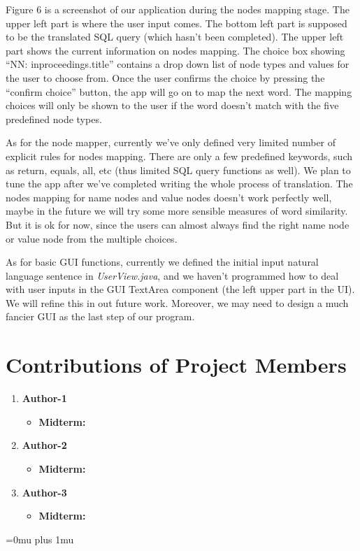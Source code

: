 \documentclass[twocolumn]{article}
\begin{document}
Figure 6 is a screenshot of our application during the nodes mapping stage. The upper left part is where the user input comes. The bottom left part is supposed to be the translated SQL query (which hasn’t been completed). The upper left part shows the current information on nodes mapping. The choice box showing “NN: inproceedings.title” contains a drop down list of node types and values for the user to choose from. Once the user confirms the choice by pressing the “confirm choice” button, the app will go on to map the next word. The mapping choices will only be shown to the user if the word doesn’t match with the five predefined node types.

As for the node mapper, currently we’ve only defined very limited number of explicit rules for nodes mapping. There are only a few predefined keywords, such as return, equals, all, etc (thus limited SQL query functions as well). We plan to tune the app after we’ve completed writing the whole process of translation. The nodes mapping for name nodes and value nodes doesn’t work perfectly well, maybe in the future we will try some more sensible measures of word similarity. But it is ok for now, since the users can almost always find the right name node or value node from the multiple choices. 

As for basic GUI functions, currently we defined the initial input natural language sentence in \textit{UserView.java}, and we haven't programmed how to deal with user inputs in the GUI TextArea component (the left upper part in the UI). We will refine this in out future work. Moreover, we may need to design a much fancier GUI as the last step of our program.

\section{Contributions of Project Members}

\begin{enumerate}
\item {\bf Author-1}
\begin{itemize}
\item {\bf Midterm:}
\end{itemize}
\item {\bf Author-2}
\begin{itemize}
\item {\bf Midterm:}
\end{itemize}
\item {\bf Author-3}
\begin{itemize}
\item {\bf Midterm:}
\end{itemize}
\end{enumerate}

\Urlmuskip=0mu plus 1mu\relax


\end{document}
